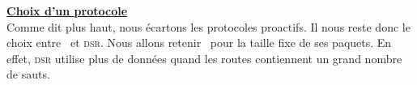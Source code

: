     \underline{\textbf{Choix d'un protocole}}\\

    Comme dit plus haut, nous écartons les protocoles proactifs. Il nous reste donc le choix entre \aodv\ et \textsc{dsr}.
    Nous allons retenir \aodv\ pour la taille fixe de ses paquets. En effet, \textsc{dsr} utilise plus de données quand
    les routes contiennent un grand nombre de sauts.

    
    
%    
%    
